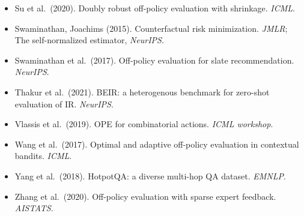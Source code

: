 \documentclass[11pt]{article}
\begin{document}
\begin{itemize}
\item Su et al.\ (2020).  Doubly robust off-policy evaluation with shrinkage.  \emph{ICML}.
\item Swaminathan, Joachims (2015).  Counterfactual risk minimization.  \emph{JMLR}; The self-normalized estimator, \emph{NeurIPS}.
\item Swaminathan et al.\ (2017).  Off-policy evaluation for slate recommendation.  \emph{NeurIPS}.
\item Thakur et al.\ (2021).  BEIR: a heterogenous benchmark for zero-shot evaluation of IR.  \emph{NeurIPS}.
\item Vlassis et al.\ (2019).  OPE for combinatorial actions.  \emph{ICML workshop}.
\item Wang et al.\ (2017).  Optimal and adaptive off-policy evaluation in contextual bandits.  \emph{ICML}.
\item Yang et al.\ (2018).  HotpotQA: a diverse multi-hop QA dataset.  \emph{EMNLP}.
\item Zhang et al.\ (2020).  Off-policy evaluation with sparse expert feedback.  \emph{AISTATS}.
\end{itemize}
\end{document}
